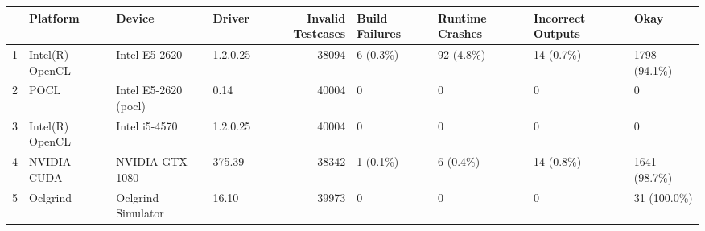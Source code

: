 \begin{tabular}{llllrllll}
\toprule
{} &         Platform &                Device &    Driver &  Invalid Testcases & Build Failures & Runtime Crashes & Incorrect Outputs &          Okay \\
\midrule
1 &  Intel(R) OpenCL &         Intel E5-2620 &  1.2.0.25 &              38094 &       6 (0.3\%) &       92 (4.8\%) &         14 (0.7\%) &  1798 (94.1\%) \\
2 &             POCL &  Intel E5-2620 (pocl) &      0.14 &              40004 &              0 &               0 &                 0 &             0 \\
3 &  Intel(R) OpenCL &         Intel i5-4570 &  1.2.0.25 &              40004 &              0 &               0 &                 0 &             0 \\
4 &      NVIDIA CUDA &       NVIDIA GTX 1080 &    375.39 &              38342 &       1 (0.1\%) &        6 (0.4\%) &         14 (0.8\%) &  1641 (98.7\%) \\
5 &         Oclgrind &    Oclgrind Simulator &     16.10 &              39973 &              0 &               0 &                 0 &   31 (100.0\%) \\
\bottomrule
\end{tabular}
